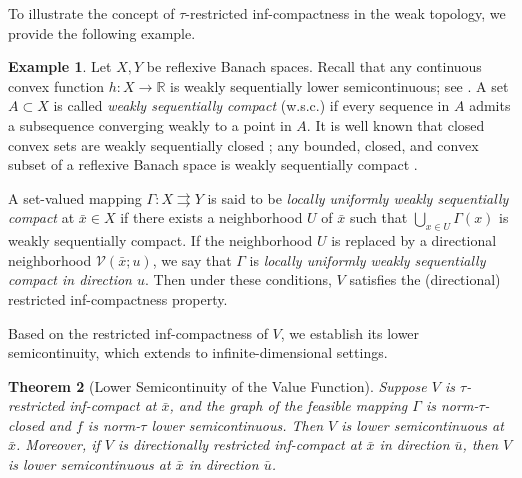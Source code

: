 \documentclass[12pt,twoside,reqno]{amsart}
\newtheorem{theorem}{Theorem}[section]
\theoremstyle{definition}
\newtheorem{example}[theorem]{Example}
\numberwithin{equation}{section}
\begin{document}
To illustrate the concept of \(\tau\)-restricted inf-compactness in the weak topology, we provide the following example. 

\begin{example}\label{example weak infcompact}
Let \( X,Y \) be reflexive Banach spaces.   
Recall that any continuous convex function \( h : X \to \mathbb{R} \) is weakly sequentially lower semicontinuous; see \cite[Theorem~1.18]{hinze2008optimization}.  
A set \( A \subset X \) is called \emph{weakly sequentially compact} (w.s.c.) if every sequence in \( A \) admits a subsequence converging weakly to a point in \( A \).  
It is well known that closed convex sets are weakly sequentially closed \cite[Theorem~1.16]{hinze2008optimization}; any bounded, closed, and convex subset of a reflexive Banach space is weakly sequentially compact \cite[Theorem~1.17]{hinze2008optimization}.

A set-valued mapping \( \Gamma : X \rightrightarrows Y \) is said to be \emph{locally uniformly weakly sequentially compact} at \( \bar{x} \in X \) if there exists a neighborhood \( U \) of \( \bar{x} \) such that $\bigcup_{x \in U} \Gamma(x)$ 
is weakly sequentially compact.  
If the neighborhood \( U \) is replaced by a directional neighborhood \( \mathcal{V}(\bar{x};u) \), we say that \( \Gamma \) is \emph{locally uniformly weakly sequentially compact in direction \( u \)}.  Then 
under these conditions, \( V \) satisfies the (directional) restricted inf-compactness property.
\end{example}

Based on the restricted inf-compactness of \( V \), we establish its lower semicontinuity, which extends \cite[Proposition~3.1]{Bai2023Directional} to infinite-dimensional settings.  

\begin{theorem}[Lower Semicontinuity of the Value Function]\label{theorem of lsc for V}
Suppose \( V \) is \(\tau\)-restricted inf-compact at \( \bar{x} \), and the graph of the feasible mapping \( \Gamma \) is norm-\(\tau\)-closed and $f$ is norm-$\tau$ lower semicontinuous.   
Then \( V \) is lower semicontinuous at \( \bar{x} \).  
Moreover, if \( V \) is directionally restricted inf-compact at \( \bar{x} \) in direction \( \bar{u} \), then \( V \) is lower semicontinuous at $\bar x$ in direction \( \bar{u} \).
\end{theorem}
\end{document}
